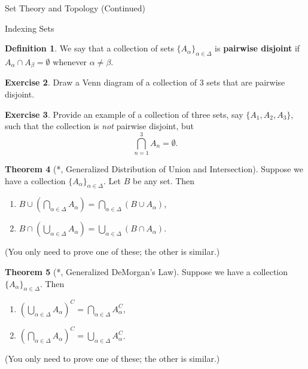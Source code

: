 \documentclass[11pt]{article}
\theoremstyle{definition}
\newtheorem{theorem}{Theorem}[section]
\newtheorem{definition}[theorem]{Definition}
\newtheorem{exercise}[theorem]{Exercise}
\begin{document}
\begin{section}{Set Theory and Topology (Continued)}
\begin{subsection}{Indexing Sets}
\begin{definition}
We say that a collection of sets $\{A_{\alpha}\}_{\alpha\in\Delta}$ is \textbf{pairwise disjoint} if $A_{\alpha} \cap A_{\beta}=\emptyset$ whenever $\alpha\neq \beta$.
\end{definition}

\begin{exercise}
Draw a Venn diagram of a collection of 3 sets that are pairwise disjoint.
\end{exercise}

\begin{exercise}
Provide an example of a collection of three sets, say $\{A_1, A_2, A_3\}$, such that the collection is \emph{not} pairwise disjoint, but 
\[
\bigcap_{n=1}^3 A_n=\emptyset.
\]
\end{exercise}

\begin{theorem}[*, Generalized Distribution of Union and Intersection]
Suppose we have a collection $\{A_{\alpha}\}_{\alpha\in\Delta}$.  Let $B$ be any set.  Then
\begin{enumerate}
\item $\displaystyle B \cup \left(\bigcap_{\alpha\in\Delta}A_{\alpha}\right)=\bigcap_{\alpha\in\Delta}(B\cup A_{\alpha})$,
\item $\displaystyle B \cap \left(\bigcup_{\alpha\in\Delta}A_{\alpha}\right)=\bigcup_{\alpha\in\Delta}(B\cap A_{\alpha})$.
\end{enumerate}
(You only need to prove one of these; the other is similar.)
\end{theorem}

\begin{theorem}[*, Generalized DeMorgan's Law]
Suppose we have a collection $\{A_{\alpha}\}_{\alpha\in\Delta}$.  Then
\begin{enumerate}
\item $\displaystyle \left(\bigcup_{\alpha\in\Delta} A_{\alpha}\right)^C=\bigcap_{\alpha\in\Delta}A_{\alpha}^{C}$,
\item $\displaystyle \left(\bigcap_{\alpha\in\Delta} A_{\alpha}\right)^C=\bigcup_{\alpha\in\Delta}A_{\alpha}^{C}$.
\end{enumerate}
(You only need to prove one of these; the other is similar.)
\end{theorem}

\end{subsection}

\end{section}
\end{document}
